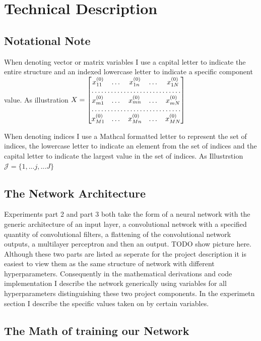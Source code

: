 \documentclass{article}
\begin{document}
\pagebreak	
\section{Technical Description}
\subsection{Notational Note}
When denoting vector or matrix variables I use a capital letter to indicate the entire structure and an indexed lowercase letter to indicate a specific component value.
As illustration 
$X=  \begin{bmatrix}
x^{(0)}_{11}  & \dots & x^{(0)}_{1n}& \dots& x^{(0)}_{1N} \\
\hdotsfor{5} \\
x^{(0)}_{m1}        & \dots& x^{(0)}_{mn} & \dots& x^{(0)}_{mN}\\
\hdotsfor{5}\\
x^{(0)}_{M1}        & \dots & x^{(0)}_{Mn}& \dots &x^{(0)}_{MN}
\end{bmatrix}$

When denoting indices I use a Mathcal formatted letter to represent the set of indices, the lowercase letter to indicate an element from the set of indices and the capital letter to indicate the largest value in the set of indices.    As Illustrstion\\
$\mathcal{J}=\{1,...j,...J\}$

\subsection{The Network Architecture}
Experiments part 2 and part 3 both take the form of a neural network with the generic architecture of an input layer, a convolutional network with a specified quantity of convolutional filters, a flattening of the convolutional network outputs, a multilayer perceptron and then an output.   TODO show picture here.  Although these two parts are listed as seperate for the project description it is easiest to view them as the same structure of network with different hyperparameters.  Consequently in the mathematical derivations and code implementation I describe the network generically using variables for all hyperparameters distinguishing these two project components.  In the experimetn section I describe the specific values taken on by certain variables.

\subsection{The Math of training our Network}
\end{document}
